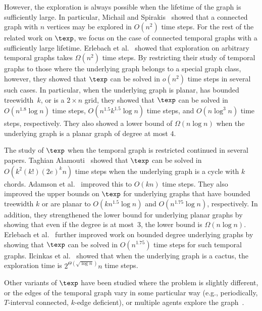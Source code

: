 However, the exploration is always possible when the lifetime of the graph is
sufficiently large. In particular, Michail and Spirakis~\cite{MichailS16} showed
that a connected graph with $n$ vertices may be explored in $O(n^2)$ time steps. For
the rest of the related work on $\texp$, we focus on the case of connected
temporal graphs with a sufficiently large lifetime. Erlebach et
al.~\cite{ErlebachHK21} showed that exploration on arbitrary temporal graphs
takes $\Omega(n^2)$ time steps. By restricting their study of temporal
graphs to those where the underlying graph belongs to a special graph class,
however, they showed that $\texp$ can be solved in $o(n^2)$ time steps in
several such cases. In particular,
when the underlying graph is planar, has bounded treewidth~$k$, or is a $2
\times n$ grid, they showed that $\texp$ can be solved in $O(n^{1.8} \log n)$
time steps, $O(n^{1.5} k^{1.5} \log n)$ time steps, and $O(n \log^3 n)$ time
steps, respectively. They also showed a lower bound of $\Omega(n \log n)$ when
the underlying graph is a planar graph of degree at most $4$. 

The study of $\texp$ when the temporal graph is restricted continued in
several papers. Taghian Alamouti~\cite{Taghian20} showed that $\texp$ can be
solved in $O(k^2 (k!) (2e)^k n)$ time steps when the underlying graph is a cycle
with $k$ chords. Adamson et al.~\cite{AdamsonGMZ22} improved this to $O(kn)$
time steps. They also improved the upper bounds on $\texp$ for underlying graphs
that have bounded treewidth $k$ or are planar to $O(k n^{1.5} \log n)$ and
$O(n^{1.75} \log n)$, respectively. In addition, they strengthened the lower bound for
underlying planar graphs by showing that even if the degree is at most~$3$, the
lower bound is $\Omega(n \log n)$. Erlebach et al.~\cite{ErlebachKLSS19} further
improved work on bounded degree underlying graphs by showing that  $\texp$ can
be solved in $O(n^{1.75})$ time steps for such temporal graphs.
Ilcinkas et al.~\cite{IlcinkasKW14}
showed that when the underlying graph is a cactus, the exploration time is
$2^{\Theta(\sqrt{\log n})} n$ time steps. 

Other variants of $\texp$ have been studied where the problem is slightly
different, or the edges of the temporal graph vary in some particular way (e.g.,
periodically, $T$-interval connected, $k$-edge deficient), or multiple agents
explore the
graph~\cite{AaronKM14a,AaronKM14b,AkridaMSR21,BumpusM23,ErlebachS22a,ErlebachS22b,IlcinkasW13}. 



